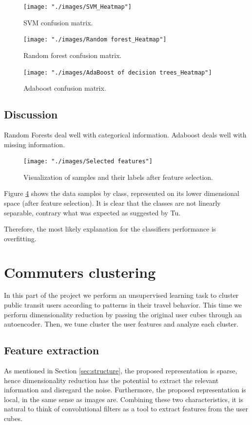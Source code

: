 \documentclass{article}
\begin{document}
\begin{figure}[H]
  \centering
  \texttt{[image: "./images/SVM\_Heatmap"]}
  \caption{SVM confusion matrix.}
  \label{fig:classification/svm_confusion}
\end{figure}

\begin{figure}[H]
  \centering
  \texttt{[image: "./images/Random forest\_Heatmap"]}
  \caption{Random forest confusion matrix.}
  \label{fig:classification/rf_confusion}
\end{figure}


\begin{figure}[H]
  \centering
  \texttt{[image: "./images/AdaBoost of decision trees\_Heatmap"]}
  \caption{Adaboost confusion matrix.}
  \label{fig:classification/adb_confusion}
\end{figure}


\subsection{Discussion}
Random Forests deal well with categorical information. Adaboost deals well with missing information.


\begin{figure}[H]
  \centering
  \texttt{[image: "./images/Selected features"]}
  \caption{Visualization of samples and their labels after feature selection.}
  \label{fig:classification/tsne}
\end{figure}

Figure \ref{fig:classification/tsne} shows the data samples by class, represented on its lower dimensional space (after feature selection). It is clear that the classes are not linearly separable, contrary what was expected as suggested by Tu. 

Therefore, the most likely explanation for the classifiers performance is overfitting. 


\newpage
\section{Commuters clustering}
\label{sec:partIII}
In this part of the project we perform an unsupervised learning task to cluster public transit users according to patterns in their travel behavior. This time we perform dimensionality reduction by passing the original user cubes through an autoencoder. Then, we tune cluster the user features and analyze each cluster. 

\subsection{Feature extraction}
As mentioned in Section \ref{sec:structure}, the proposed representation is sparse, hence dimensionality reduction has the potential to extract the relevant information and disregard the noise. Furthermore, the proposed representation is local, in the same sense as images are. Combining these two characteristics, it is natural to think of convolutional filters as a tool to extract features from the user cubes. 
\end{document}
